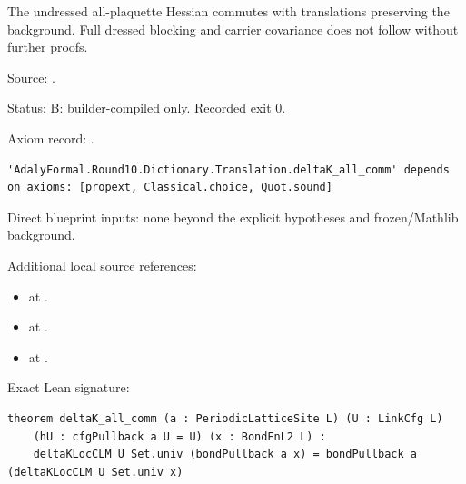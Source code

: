 \begin{theorem}[bp-136]
\label{bp-136}
\uses{}
\leanok
The undressed all-plaquette Hessian commutes with translations preserving the background. Full dressed blocking and carrier covariance does not follow without further proofs.

\par Source: \texttt{}.
\par Status: B: builder-compiled only. Recorded exit 0.
\par Axiom record: \texttt{}.
\begin{verbatim}
'AdalyFormal.Round10.Dictionary.Translation.deltaK_all_comm' depends on axioms: [propext, Classical.choice, Quot.sound]
\end{verbatim}
\par Direct blueprint inputs: none beyond the explicit hypotheses and frozen/Mathlib background.
\par Additional local source references:
\begin{itemize}
\item \texttt{} at \texttt{}.
\item \texttt{} at \texttt{}.
\item \texttt{} at \texttt{}.
\end{itemize}
\par Exact Lean signature:
\begin{verbatim}
theorem deltaK_all_comm (a : PeriodicLatticeSite L) (U : LinkCfg L)
    (hU : cfgPullback a U = U) (x : BondFnL2 L) :
    deltaKLocCLM U Set.univ (bondPullback a x) = bondPullback a (deltaKLocCLM U Set.univ x)
\end{verbatim}
\end{theorem}

